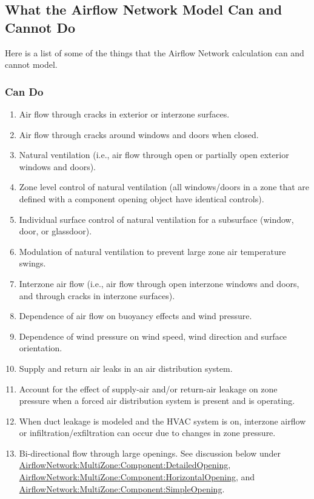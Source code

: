 \subsection{What the Airflow Network Model Can and Cannot Do}\label{what-the-airflow-network-model-can-and-cannot-do}

Here is a list of some of the things that the Airflow Network calculation can and cannot model.

\subsubsection{Can Do}\label{can-do}
\begin{enumerate}
\item Air flow through cracks in exterior or interzone surfaces.
\item Air flow through cracks around windows and doors when closed.
\item Natural ventilation (i.e., air flow through open or partially open exterior windows and doors).
\item Zone level control of natural ventilation (all windows/doors in a zone that are defined with a component opening object have identical controls).
\item Individual surface control of natural ventilation for a subsurface (window, door, or glassdoor).
\item Modulation of natural ventilation to prevent large zone air temperature swings.
\item Interzone air flow (i.e., air flow through open interzone windows and doors, and through cracks in interzone surfaces).
\item Dependence of air flow on buoyancy effects and wind pressure.
\item Dependence of wind pressure on wind speed, wind direction and surface orientation.
\item Supply and return air leaks in an air distribution system.
\item Account for the effect of supply-air and/or return-air leakage on zone pressure when a forced air distribution system is present and is operating.
\item When duct leakage is modeled and the HVAC system is on, interzone airflow or infiltration/exfiltration can occur due to changes in zone pressure.
\item Bi-directional flow through large openings. See discussion below under \hyperref[airflownetworkmultizonecomponentdetailedopening]{AirflowNetwork:MultiZone:Component:DetailedOpening}, \hyperref[airflownetworkmultizonecomponenthorizontalopening]{AirflowNetwork:MultiZone:Component:HorizontalOpening}, and \hyperref[airflownetworkmultizonecomponentsimpleopening]{AirflowNetwork:MultiZone:Component:SimpleOpening}.

\end{enumerate}
